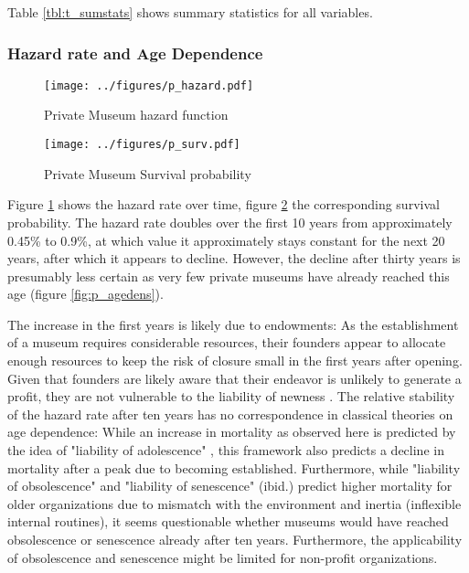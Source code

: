 \documentclass[11pt]{article}
\begin{document}
Table \ref{tbl:t_sumstats} shows summary statistics for all variables.

\subsubsection*{Hazard rate and Age Dependence}


\begin{figure}[htbp]
\centering
\texttt{[image: ../figures/p\_hazard.pdf]}
\caption{\label{fig:p_hazard}Private Museum hazard function}
\end{figure}

\begin{figure}[htbp]
\centering
\texttt{[image: ../figures/p\_surv.pdf]}
\caption{\label{fig:p_surv}Private Museum Survival probability}
\end{figure}


Figure \ref{fig:p_hazard} shows the hazard rate over time, figure \ref{fig:p_surv} the corresponding survival probability.
The hazard rate doubles over the first 10 years from approximately 0.45\% to 0.9\%, at which value it approximately stays constant for the next 20 years, after which it appears to decline.
However, the decline after thirty years is presumably less certain as very few private museums have already reached this age (figure \ref{fig:p_agedens}).


The increase in the first years is likely due to endowments: As the establishment of a museum requires considerable resources, their founders appear to allocate enough resources to keep the risk of closure small in the first years after opening.
Given that founders are likely aware that their endeavor is unlikely to generate a profit, they are not vulnerable to the liability of newness \parencite{Stinchcombe_1965_structure}.
The relative stability of the hazard rate after ten years has no correspondence in classical theories on age dependence:
While an increase in mortality as observed here is predicted by the idea of "liability of adolescence" \parencite{Carroll_Khessina_2019_demography}, this framework also predicts a decline in mortality after a peak due to becoming established.
Furthermore, while "liability of obsolescence" and "liability of senescence" (ibid.) predict higher mortality for older organizations due to mismatch with the environment and inertia (inflexible internal routines), it seems questionable whether museums would have reached obsolescence or senescence already after ten years.
Furthermore, the applicability of obsolescence and senescence might be limited for non-profit organizations.
\end{document}
